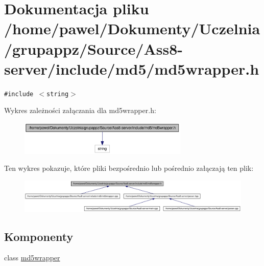 \hypertarget{a00012}{
\section{Dokumentacja pliku /home/pawel/Dokumenty/Uczelnia/grupappz/Source/Ass8-server/include/md5/md5wrapper.h}
\label{df/d86/a00012}
}
{\tt \#include $<$string$>$}\par


Wykres zależności załączania dla md5wrapper.h:\nopagebreak
\begin{figure}[H]
\begin{center}
\leavevmode
\includegraphics[width=229pt]{d6/d42/a00043}
\end{center}
\end{figure}


Ten wykres pokazuje, które pliki bezpośrednio lub pośrednio załączają ten plik:\nopagebreak
\begin{figure}[H]
\begin{center}
\leavevmode
\includegraphics[width=420pt]{d5/df9/a00044}
\end{center}
\end{figure}
\subsection*{Komponenty}
\begin{CompactItemize}
\item 
class \hyperlink{a00004}{md5wrapper}
\end{CompactItemize}
